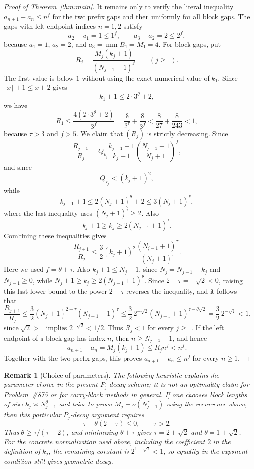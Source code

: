 \documentclass[11pt]{article}
\newtheorem{remark}{Remark}
\begin{document}
\begin{proof}[Proof of Theorem~\ref{thm:main}]
It remains only to verify the literal inequality $a_{n+1}-a_n\le n^f$ for the two prefix gaps and then uniformly for all block gaps.  The gaps with left-endpoint indices $n=1,2$ satisfy
\[
        a_2-a_1=1\le 1^f,
        \qquad
        a_3-a_2=2\le 2^f,
\]
because $a_1=1$, $a_2=2$, and $a_3=\min B_1=M_1=4$.
For block gaps, put
\[
        R_j=\frac{M_j(k_j+1)}{(N_{j-1}+1)^f}\qquad(j\ge1).
\]
The first value is below $1$ without using the exact numerical value of $k_1$.  Since $\lceil x\rceil+1\le x+2$ gives
\[
        k_1+1\le 2\cdot3^{\theta}+2,
\]
we have
\[
        R_1
        \le \frac{4(2\cdot3^{\theta}+2)}{3^f}
        =\frac{8}{3^\tau}+\frac{8}{3^f}
        <\frac{8}{27}+\frac{8}{243}<1,
\]
because $\tau>3$ and $f>5$.  We claim that $(R_j)$ is strictly decreasing.  Since
\[
        \frac{R_{j+1}}{R_j}
        =Q_{k_j}\frac{k_{j+1}+1}{k_j+1}
        \left(\frac{N_{j-1}+1}{N_j+1}\right)^f,
\]
and since
\[
        Q_{k_j}<(k_j+1)^2,
\]
while
\[
        k_{j+1}+1
        \le 2(N_j+1)^\theta+2
        \le 3(N_j+1)^\theta,
\]
where the last inequality uses $(N_j+1)^\theta\ge2$.  Also
\[
        k_j+1\ge k_j\ge2(N_{j-1}+1)^\theta.
\]
Combining these inequalities gives
\[
        \frac{R_{j+1}}{R_j}
        \le
        \frac32 (k_j+1)^2
        \frac{(N_{j-1}+1)^\tau}{(N_j+1)^\tau}.
\]
Here we used $f=\theta+\tau$.  Also $k_j+1\le N_j+1$, since $N_j=N_{j-1}+k_j$ and $N_{j-1}\ge0$, while $N_j+1\ge k_j\ge2(N_{j-1}+1)^\theta$.  Since $2-\tau=-\sqrt2<0$, raising this last lower bound to the power $2-\tau$ reverses the inequality, and it follows that
\[
        \frac{R_{j+1}}{R_j}
        \le
        \frac32 (N_j+1)^{2-\tau}(N_{j-1}+1)^\tau
        \le
        \frac32\,2^{-\sqrt2}(N_{j-1}+1)^{\tau-\theta\sqrt2}
        =\frac32\,2^{-\sqrt2}<1,
\]
since $\sqrt2>1$ implies $2^{-\sqrt2}<1/2$.
Thus $R_j<1$ for every $j\ge1$.  If the left endpoint of a block gap has index $n$, then $n\ge N_{j-1}+1$, and hence
\[
        a_{n+1}-a_n=M_j(k_j+1)\le R_j n^f<n^f.
\]
Together with the two prefix gaps, this proves $a_{n+1}-a_n\le n^f$ for every $n\ge1$.
\end{proof}

\begin{remark}[Choice of parameters]\label{rem:parameters}
The following heuristic explains the parameter choice in the present $P_j$-decay scheme; it is not an optimality claim for Problem~\#875 or for carry-block methods in general.  If one chooses block lengths of size $k_j\asymp N_{j-1}^{\theta}$ and tries to prove $M_j=o(N_{j-1}^{\tau})$ using the recurrence above, then this particular $P_j$-decay argument requires
\[
        \tau+\theta(2-\tau)\le0,
        \qquad \tau>2.
\]
Thus $\theta\ge \tau/(\tau-2)$, and minimizing $\theta+\tau$ gives $\tau=2+\sqrt2$ and $\theta=1+\sqrt2$.  For the concrete normalization used above, including the coefficient $2$ in the definition of $k_j$, the remaining constant is $2^{1-\sqrt2}<1$, so equality in the exponent condition still gives geometric decay.
\end{remark}
\end{document}
